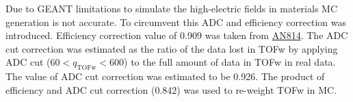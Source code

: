 Due to GEANT limitations to simulate the high-electric fields in materials MC generation is not accurate. To circumvent this ADC and efficiency correction was introduced. Efficiency correction value of 0.909 was taken from \href{https://phenix-intra.sdcc.bnl.gov/phenix/WWW/p/draft/belmonrj/AnalysisNotes/ananoterun7.pdf}{AN814}. The ADC cut correction was estimated as the ratio of the data lost in TOFw by applying ADC cut ($60 < q_{\text{TOFw}} < 600$) to the full amount of data in TOFw in real data. The value of ADC cut correction was estimated to be 0.926. The product of efficiency and ADC cut correction (0.842) was used to re-weight TOFw in MC.
